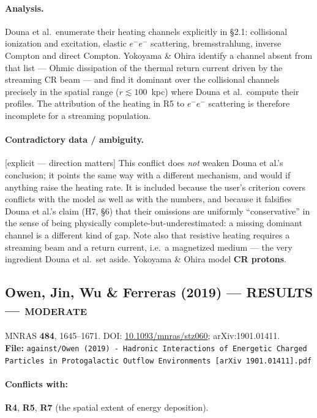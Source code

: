 \documentclass[11pt,a4paper]{article}
\newcommand{\RES}{\textcolor{red!60!black}{\textbf{RESULTS}}}
\newcommand{\flag}[1]{\textcolor{orange!75!black}{\textsf{\small [#1]}}}
\begin{document}
\paragraph{Analysis.}
Douna et al.\ enumerate their heating channels explicitly in \S2.1:
collisional ionization and excitation, elastic $e^-e^-$ scattering,
bremsstrahlung, inverse Compton and direct Compton. Yokoyama \& Ohira identify a
channel absent from that list --- Ohmic dissipation of the thermal return
current driven by the streaming CR beam --- and find it dominant over the
collisional channels precisely in the spatial range ($r\lesssim100$~kpc) where
Douna et al.\ compute their profiles. The attribution of the heating in R5 to
$e^-e^-$ scattering is therefore incomplete for a streaming population.

\paragraph{Contradictory data / ambiguity.} \flag{explicit --- direction matters}
This conflict does \emph{not} weaken Douna et al.'s conclusion; it points the
same way with a different mechanism, and would if anything raise the heating
rate. It is included because the user's criterion covers conflicts with the
model as well as with the numbers, and because it falsifies Douna et al.'s
claim (H7, \S6) that their omissions are uniformly ``conservative'' in the sense
of being physically complete-but-underestimated: a missing dominant channel is
a different kind of gap. Note also that resistive heating requires a streaming
beam and a return current, i.e.\ a magnetized medium --- the very ingredient
Douna et al.\ set aside. Yokoyama \& Ohira model \textbf{CR protons}.

\subsection{Owen, Jin, Wu \& Ferreras (2019) --- \RES{} --- \textsc{moderate}}
\noindent MNRAS \textbf{484}, 1645--1671. DOI:
\href{https://doi.org/10.1093/mnras/stz060}{10.1093/mnras/stz060};
arXiv:1901.01411.\\
\textbf{File:} \texttt{against/Owen (2019) - Hadronic Interactions of Energetic Charged Particles in Protogalactic Outflow Environments [arXiv 1901.01411].pdf}

\paragraph{Conflicts with:} \textbf{R4}, \textbf{R5}, \textbf{R7} (the spatial
extent of energy deposition).
\end{document}
